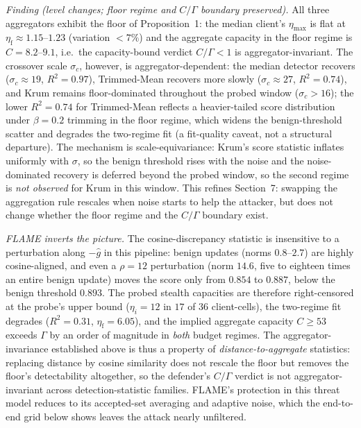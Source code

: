 \documentclass[final,1p,times]{elsarticle}
\begin{document}
\emph{Finding (level changes; floor regime and $C/\Gamma$ boundary preserved).} All three aggregators
exhibit the floor of Proposition~1: the median
client's $\eta_{\max}$ is flat at $\eta_{\mathrm{f}}\approx1.15$--$1.23$
(variation $<7\%$) and the aggregate capacity in the floor regime is
$C=8.2$--$9.1$, i.e.\ the capacity-bound verdict $C/\Gamma<1$ is
aggregator-invariant. The crossover scale $\sigma_c$, however, is
aggregator-dependent: the median detector recovers
($\sigma_c{\approx}19$, $R^2{=}0.97$), Trimmed-Mean recovers more
slowly ($\sigma_c{\approx}27$, $R^2{=}0.74$), and Krum remains
floor-dominated throughout the probed window ($\sigma_c>16$); the lower
$R^2{=}0.74$ for Trimmed-Mean reflects a heavier-tailed score
distribution under $\beta{=}0.2$ trimming in the floor regime, which
widens the benign-threshold scatter and degrades the two-regime fit (a
fit-quality caveat, not a structural departure). The
mechanism is scale-equivariance: Krum's score statistic inflates
uniformly with $\sigma$, so the benign threshold rises with the noise
and the noise-dominated recovery is deferred beyond the probed window,
so the second regime is \emph{not observed} for Krum in this window. This
refines Section~7: swapping the aggregation
rule rescales when noise starts to help the attacker, but does not
change whether the floor regime and the $C/\Gamma$ boundary exist.

\emph{FLAME inverts the picture.} The cosine-discrepancy statistic is
insensitive to a perturbation along $-\hat g$ in this pipeline: benign
updates (norms $0.8$--$2.7$) are highly cosine-aligned, and even a
$\rho{=}12$ perturbation (norm $14.6$, five to eighteen times an entire
benign update) moves the score only from $0.854$ to $0.887$, below the
benign threshold $0.893$. The probed stealth capacities are therefore
right-censored at the probe's upper bound ($\eta_i{=}12$ in $17$ of
$36$ client-cells), the two-regime fit degrades ($R^2{=}0.31$,
$\eta_{\mathrm{f}}{=}6.05$), and the implied aggregate capacity
$C\ge53$ exceeds $\Gamma$ by an order of magnitude in \emph{both}
budget regimes. The aggregator-invariance established above is thus a
property of \emph{distance-to-aggregate} statistics: replacing distance
by cosine similarity does not rescale the floor but removes the floor's
detectability altogether, so the defender's $C/\Gamma$ verdict is not
aggregator-invariant across detection-statistic families. FLAME's
protection in this threat model reduces to its accepted-set averaging
and adaptive noise, which the end-to-end grid below shows leaves the
attack nearly unfiltered.
\end{document}
